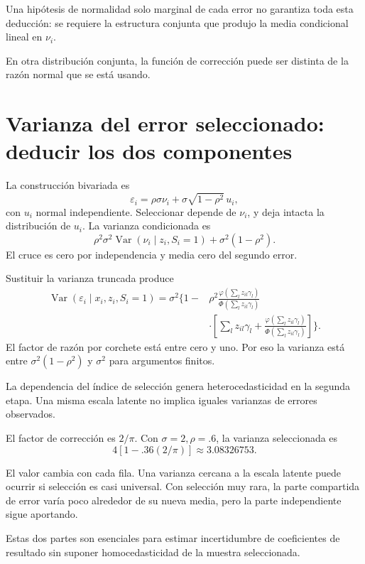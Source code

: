 \documentclass[11pt,a4paper]{article}
\DeclareMathOperator{\Var}{Var}
\begin{document}
Una hipótesis de normalidad
solo marginal de cada error
no garantiza toda esta deducción:
se requiere la estructura conjunta
que produjo la media condicional
lineal en \(\nu_i\).

En otra distribución conjunta,
la función de corrección puede
ser distinta de la razón
normal que se está usando.

\clearpage
\section{Varianza del error seleccionado: deducir los dos componentes}\label{unidad124}
La construcción bivariada es
\[
\varepsilon_i=\rho\sigma\nu_i
+\sigma\sqrt{1-\rho^2}\,u_i,
\]
con \(u_i\) normal independiente.
Seleccionar depende de \(\nu_i\),
y deja intacta la distribución de \(u_i\).
La varianza condicionada es
\[
\rho^2\sigma^2\Var(\nu_i\mid z_i,S_i=1)
+\sigma^2(1-\rho^2).
\]
El cruce es cero por independencia
y media cero del segundo error.

Sustituir la varianza truncada produce
\[
\begin{aligned}
\Var(\varepsilon_i\mid x_i,z_i,S_i=1)
=\sigma^2\Bigg\{1-&\rho^2
\frac{\varphi(\sum_lz_{il}\gamma_l)}
{\Phi(\sum_lz_{il}\gamma_l)}\\
&\cdot\left[
\sum_lz_{il}\gamma_l+
\frac{\varphi(\sum_lz_{il}\gamma_l)}
{\Phi(\sum_lz_{il}\gamma_l)}
\right]\Bigg\}.
\end{aligned}
\]
El factor de razón por corchete
está entre cero y uno.
Por eso la varianza está entre
\(\sigma^2(1-\rho^2)\) y \(\sigma^2\)
para argumentos finitos.

La dependencia del índice de
selección genera heterocedasticidad
en la segunda etapa.
Una misma escala latente
no implica iguales varianzas
de errores observados.

\begin{ejemplo}
El factor de corrección es \(2/\pi\).
Con \(\sigma=2,\rho=.6\),
la varianza seleccionada es
\[
4[1-.36(2/\pi)]\approx3.08326753.
\]
\end{ejemplo}
El valor cambia con cada fila.
Una varianza cercana a la
escala latente puede ocurrir
si selección es casi universal.
Con selección muy rara,
la parte compartida de error
varía poco alrededor de su
nueva media, pero la parte
independiente sigue aportando.

Estas dos partes son esenciales
para estimar incertidumbre
de coeficientes de resultado
sin suponer homocedasticidad
de la muestra seleccionada.
\end{document}
